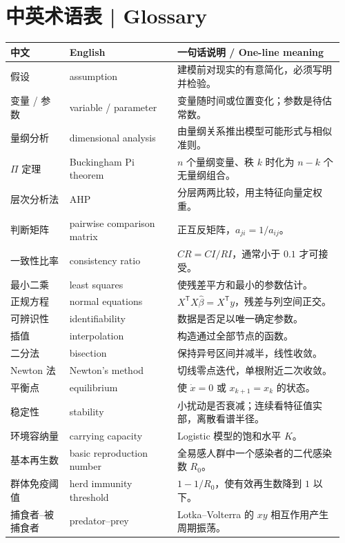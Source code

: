 \documentclass[UTF8,11pt,a4paper]{ctexart}
\begin{document}
\section*{中英术语表 | Glossary}
\par\noindent\footnotesize\renewcommand{\arraystretch}{0.95}\setlength{\tabcolsep}{4pt}
\begin{tabular}{@{}p{0.17\linewidth}p{0.31\linewidth}p{0.48\linewidth}@{}}
\hline
中文 & English & 一句话说明 / One-line meaning \\
\hline
假设 & assumption & 建模前对现实的有意简化，必须写明并检验。 \\
变量 / 参数 & variable / parameter & 变量随时间或位置变化；参数是待估常数。 \\
量纲分析 & dimensional analysis & 由量纲关系推出模型可能形式与相似准则。 \\
$\Pi$ 定理 & Buckingham Pi theorem & $n$ 个量纲变量、秩 $k$ 时化为 $n-k$ 个无量纲组合。 \\
层次分析法 & AHP & 分层两两比较，用主特征向量定权重。 \\
判断矩阵 & pairwise comparison matrix & 正互反矩阵，$a_{ji}=1/a_{ij}$。 \\
一致性比率 & consistency ratio & $CR=CI/RI$，通常小于 $0.1$ 才可接受。 \\
最小二乘 & least squares & 使残差平方和最小的参数估计。 \\
正规方程 & normal equations & $X^{\mathsf T}X\hat\beta=X^{\mathsf T}y$，残差与列空间正交。 \\
可辨识性 & identifiability & 数据是否足以唯一确定参数。 \\
插值 & interpolation & 构造通过全部节点的函数。 \\
二分法 & bisection & 保持异号区间并减半，线性收敛。 \\
Newton 法 & Newton's method & 切线零点迭代，单根附近二次收敛。 \\
平衡点 & equilibrium & 使 $\dot x=0$ 或 $x_{k+1}=x_k$ 的状态。 \\
稳定性 & stability & 小扰动是否衰减；连续看特征值实部，离散看谱半径。 \\
环境容纳量 & carrying capacity & Logistic 模型的饱和水平 $K$。 \\
基本再生数 & basic reproduction number & 全易感人群中一个感染者的二代感染数 $R_0$。 \\
群体免疫阈值 & herd immunity threshold & $1-1/R_0$，使有效再生数降到 $1$ 以下。 \\
捕食者--被捕食者 & predator--prey & Lotka--Volterra 的 $xy$ 相互作用产生周期振荡。 \\

\end{tabular}
\end{document}
